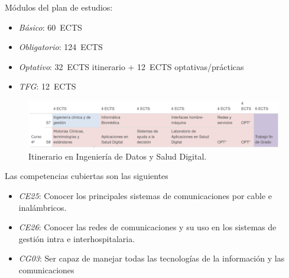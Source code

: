 \documentclass[xcolor=table,xcolor=x11names]{beamer}
\begin{document}
\begin{frame}{\subsecname}

Módulos del plan de estudios:
\begin{itemize}
    \item \emph{Básico}: 60~ECTS
    \item \emph{Obligatorio}: 124~ECTS
    \item \emph{Optativo}: 32~ECTS itinerario + 12~ECTS
        optativas/prácticas
    \item \emph{TFG}: 12~ECTS
\end{itemize}
        

\begin{figure}[t]
    \centering
    \includegraphics[width=.9\textwidth]{figures/gib-itinerario-datos}
    \caption{Itinerario en Ingeniería de Datos y Salud Digital.}
    \label{fig:gib-itinerario-datos}
\end{figure}

\end{frame}






\begin{frame}{\subsecname}
    Las competencias cubiertas son las siguientes
    \begin{itemize}
        \item \emph{CE25}: Conocer los principales sistemas de comunicaciones por cable e inalámbricos.
        \item \emph{CE26}: Conocer las redes de comunicaciones y su uso en los sistemas de gestión intra e interhospitalaria.
        \item \emph{CG03}: Ser capaz de manejar todas las tecnologías de la información y las comunicaciones
    \end{itemize}
\end{frame}
\end{document}
